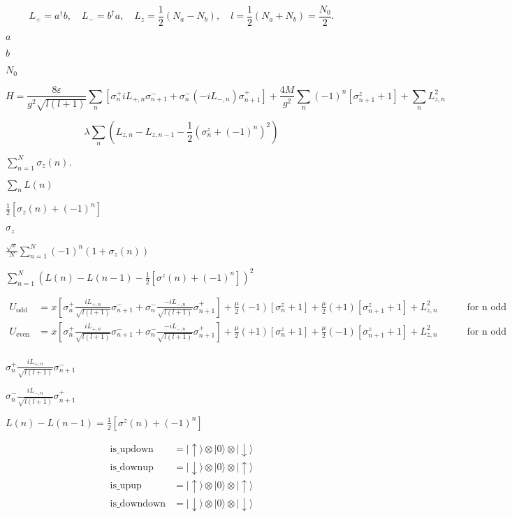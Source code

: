 \documentclass{article}
\begin{document}
{\[L_+ = a^\dagger b,\quad L_- = b^\dagger a,\quad L_z = \frac{1}{2}(N_a - N_b),\quad l=\frac{1}{2}(N_a+N_b) = \frac{N_0}{2}.  \]
\pagebreak

$ a$
\pagebreak

$ b $
\pagebreak

$ N_{0} $
\pagebreak

\[H = \frac{8\varepsilon}{g^2\sqrt{l(l+1)}}\sum_n\left[\sigma^+_n iL_{+,n}\sigma_{n+1}^- + \sigma^-_n (-iL_{-,n})\sigma_{n+1}^+\right] + \frac{4M}{g^2}\sum_n(-1)^n\left[ \sigma^z_{n+1}+1\right] + \sum_n L_{z,n}^2  \]
\pagebreak

\[ \lambda \sum_n\left( L_{z,n} - L_{z,n-1} -\frac{1}{2}\left(\sigma^z_n +(-1)^n\right)^2\right)\]
\pagebreak

$ \sum_{n=1}^N \sigma_z(n). $
\pagebreak

$ \sum_nL(n) $
\pagebreak

$ \frac{1}{2}[\sigma_z(n) + (-1)^n] $
\pagebreak

$ \sigma_z $
\pagebreak

$ \frac{\sqrt{x}}{N}\sum_{n=1}^N\left(-1\right)^n(1+\sigma_z(n)) $
\pagebreak

$ \sum_{n=1}^N\left(L(n)-L(n-1)-\frac{1}{2}\left[\sigma^z(n)+(-1)^n\right]\right)^2 $
\pagebreak

\begin{eqnarray*}
U_\mathrm{odd} &= x\left[\sigma^+_{n}\frac{iL_{+,n}}{\sqrt{l(l+1)}}\sigma^-_{n+1} +  \sigma^-_n \frac{-iL_{-,n}}{\sqrt{l(l+1)}}\sigma^+_{n+1} \right] + \frac{\mu}{2}(-1)\left[\sigma^z_n+1\right] + \frac{\mu}{2}(+1)\left[\sigma^z_{n+1}+1\right] + L_{z,n}^2\quad\quad\quad\mbox{for n odd} \\
U_\mathrm{even} &= x\left[\sigma^+_{n}\frac{iL_{+,n}}{\sqrt{l(l+1)}}\sigma^-_{n+1} +  \sigma^-_n \frac{-iL_{-,n}}{\sqrt{l(l+1)}}\sigma^+_{n+1} \right] + \frac{\mu}{2}(+1)\left[\sigma^z_n+1\right] + \frac{\mu}{2}(-1)\left[\sigma^z_{n+1}+1\right] + L_{z,n}^2\quad\quad\quad\mbox{for n odd} \\
\end{eqnarray*}
\pagebreak

$ \sigma^+_{n}\frac{iL_{+,n}}{\sqrt{l(l+1)}}\sigma^-_{n+1} $
\pagebreak

$ \sigma^-_{n}\frac{iL_{-,n}}{\sqrt{l(l+1)}}\sigma^+_{n+1} $
\pagebreak

$ L(n)-L(n-1) = \frac{1}{2}\left[\sigma^z(n)+(-1)^n\right]$
\pagebreak

\begin{eqnarray*}
\mathrm{is\_updown} &= |\uparrow\rangle\otimes |0\rangle\otimes |\downarrow\rangle \\
\mathrm{is\_downup} &= |\downarrow\rangle\otimes |0\rangle\otimes |\uparrow\rangle \\
\mathrm{is\_upup} &= |\uparrow\rangle\otimes |0\rangle\otimes |\uparrow\rangle \\
\mathrm{is\_downdown} &= |\downarrow\rangle\otimes |0\rangle\otimes |\downarrow\rangle
\end{eqnarray*}
\pagebreak

}
\end{document}
